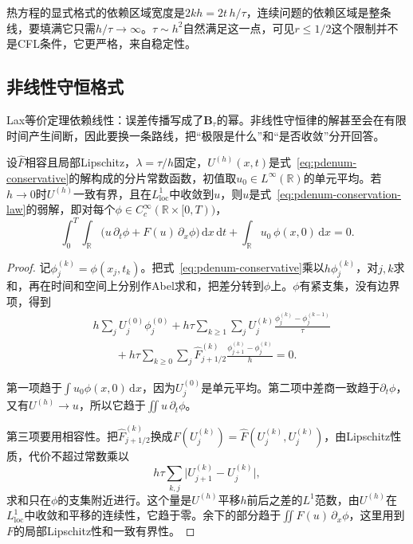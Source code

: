热方程的显式格式的依赖区域宽度是$2kh=2t\,h/\tau$，连续问题的依赖区域是整条线，要填满它只需$h/\tau\to\infty$。$\tau\sim h^2$自然满足这一点，可见$r\leq1/2$这个限制并不是CFL条件，它更严格，来自稳定性。

\subsection{非线性守恒格式}
\label{sec:pdenum-nonlinear}

Lax等价定理依赖线性：误差传播写成了$\bm{B}_\tau$的幂。非线性守恒律的解甚至会在有限时间产生间断，因此要换一条路线，把“极限是什么”和“是否收敛”分开回答。

\begin{theorem}
 \label{thm:pdenum-lax-wendroff}
 设$\widehat{F}$相容且局部Lipschitz，$\lambda=\tau/h$固定，$U^{(h)}(x,t)$是式~\eqref{eq:pdenum-conservative}的解构成的分片常数函数，初值取$u_0\in L^\infty(\mathbb{R})$的单元平均。若$h\to0$时$U^{(h)}$一致有界，且在$L^1_{\mathrm{loc}}$中收敛到$u$，则$u$是式~\eqref{eq:pdenum-conservation-law}的弱解，即对每个$\phi\in C_c^\infty(\mathbb{R}\times[0,T))$，
 \begin{equation}
  \int_0^T\!\!\int_{\mathbb{R}}\bigl(u\,\partial_t\phi+F(u)\,\partial_x\phi\bigr)\,\mathrm{d}x\,\mathrm{d}t+\int_{\mathbb{R}}u_0\,\phi(x,0)\,\mathrm{d}x=0 .
  \label{eq:pdenum-lw-limit}
 \end{equation}
\end{theorem}

\begin{proof}
 记$\phi_j^{(k)}=\phi(x_j,t_k)$。把式~\eqref{eq:pdenum-conservative}乘以$h\phi_j^{(k)}$，对$j,k$求和，再在时间和空间上分别作Abel求和，把差分转到$\phi$上。$\phi$有紧支集，没有边界项，得到
 \[
  \begin{aligned}
  &h\sum_jU_j^{(0)}\phi_j^{(0)}
  +h\tau\sum_{k\geq1}\sum_jU_j^{(k)}\frac{\phi_j^{(k)}-\phi_j^{(k-1)}}{\tau}\\
  &\qquad+h\tau\sum_{k\geq0}\sum_j\widehat{F}_{j+1/2}^{(k)}\frac{\phi_{j+1}^{(k)}-\phi_j^{(k)}}{h}=0 .
  \end{aligned}
 \]

 第一项趋于$\int u_0\phi(x,0)\,\mathrm{d}x$，因为$U_j^{(0)}$是单元平均。第二项中差商一致趋于$\partial_t\phi$，又有$U^{(h)}\to u$，所以它趋于$\iint u\,\partial_t\phi$。

 第三项要用相容性。把$\widehat{F}_{j+1/2}^{(k)}$换成$F(U_j^{(k)})=\widehat{F}(U_j^{(k)},U_j^{(k)})$，由Lipschitz性质，代价不超过常数乘以
 \[
  h\tau\sum_{k,j}\lvert U_{j+1}^{(k)}-U_j^{(k)}\rvert ,
 \]
 求和只在$\phi$的支集附近进行。这个量是$U^{(h)}$平移$h$前后之差的$L^1$范数，由$U^{(h)}$在$L^1_{\mathrm{loc}}$中收敛和平移的连续性，它趋于零。余下的部分趋于$\iint F(u)\,\partial_x\phi$，这里用到$F$的局部Lipschitz性和一致有界性。
\end{proof}

